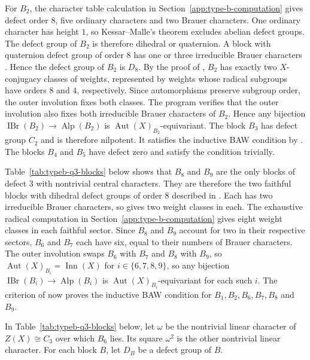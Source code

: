 \documentclass[10pt]{amsart}
\theoremstyle{definition}
\let\oldendproof\endproof
\renewenvironment{proof}[1][\proofname]{%
  \oldproof[\bfseries #1]%
}{\oldendproof}
\DeclareMathOperator{\Aut}{Aut}
\DeclareMathOperator{\Inn}{Inn}
\DeclareMathOperator{\IBr}{IBr}
\DeclareMathOperator{\Alp}{Alp}
\numberwithin{equation}{section}
\numberwithin{table}{section}
\begin{document}
\begin{proof}
For $B_2$, the character table calculation in
Section~\ref{app:type-b-computation} gives defect order $8$, five ordinary
characters and two Brauer characters. One ordinary character has
height $1$, so Kessar--Malle's theorem
\cite[Theorem~1.1]{KessarMalle2013} excludes abelian defect groups.
The defect group of $B_2$ is therefore dihedral or quaternion.
A block with quaternion defect group of order $8$ has one or three
irreducible Brauer characters
\cite[Theorem~8.1]{Sambale2014}.
Hence the defect group of $B_2$ is $D_8$.  By the proof of
\cite[Theorem~4.1]{Sambale2012}, $B_2$ has exactly two $X$-conjugacy
classes of weights, represented by weights whose radical subgroups
have orders $8$ and $4$, respectively.  Since automorphisms preserve
subgroup order, the outer involution fixes both classes.  The program
 verifies that the outer involution also fixes
both irreducible Brauer characters of $B_2$.  Hence any bijection
$\IBr(B_2)\to\Alp(B_2)$ is $\Aut(X)_{B_2}$-equivariant.
The block $B_3$ has defect group $C_2$ and is therefore nilpotent. It satisfies the inductive BAW condition by
\cite[Theorem~1.3]{KoshitaniSpath2016}. The blocks $B_4$ and $B_5$
have defect zero and satisfy the condition trivially.

Table~\ref{tab:typeb-q3-blocks} below shows that $B_8$ and $B_9$
are the only blocks of defect $3$ with nontrivial central
characters. They are therefore the two faithful blocks with
dihedral defect groups of order $8$ described in
\cite[Section~5.5]{Macgregor2022}.  Each has two irreducible
Brauer characters, so \cite[Theorem~4.1]{Sambale2012} gives two
weight classes in each.
The exhaustive radical computation in
Section~\ref{app:type-b-computation} gives eight weight classes in
each faithful sector.  Since $B_8$ and $B_9$ account for two
in their respective sectors, $B_6$ and $B_7$ each have six, equal to
their numbers of Brauer characters.  The outer involution swaps
$B_6$ with $B_7$ and $B_8$ with $B_9$, so
$\Aut(X)_{B_i}=\Inn(X)$ for $i\in\{6,7,8,9\}$, so any bijection
$\IBr(B_i)\to\Alp(B_i)$ is $\Aut(X)_{B_i}$-equivariant for each such $i$.
The criterion of \cite[Corollary~2.13]{FengLiZhang2019} now proves the
inductive BAW condition for
$B_1,B_2,B_6,B_7,B_8$ and $B_9$.
\end{proof}

In Table~\ref{tab:typeb-q3-blocks} below, let $\omega$ be the nontrivial
linear character of $Z(X)\cong C_3$ over which $B_6$ lies.
Its square $\omega^2$ is the other nontrivial linear character.
For each block $B$, let $D_B$ be a defect group of $B$.
\end{document}

